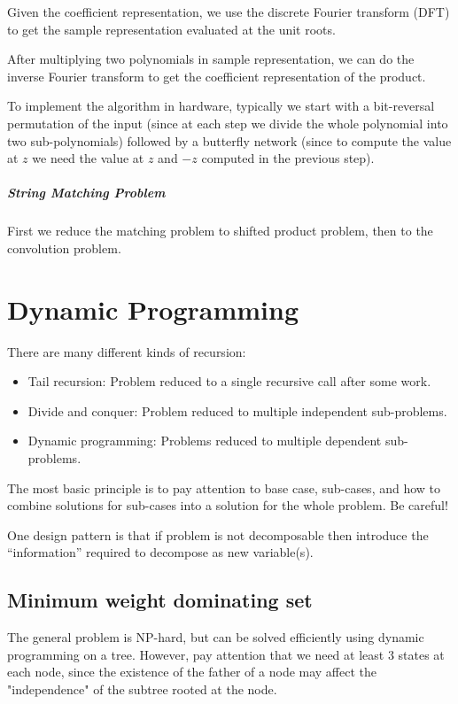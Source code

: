 \documentclass[openany]{book}
\begin{document}
Given the coefficient representation, we use the discrete Fourier transform (DFT) to get the sample representation evaluated at the unit roots.

After multiplying two polynomials in sample representation, we can do the inverse Fourier transform to get the coefficient representation of the product.

To implement the algorithm in hardware, typically we start with a bit-reversal permutation of the input (since at each step we divide the whole polynomial into two sub-polynomials) followed by a butterfly network (since to compute the value at $z$ we need the value at $z$ and $-z$ computed in the previous step).

\paragraph{String Matching Problem}
First we reduce the matching problem to shifted product problem, then to the convolution problem.

\chapter{Dynamic Programming}
There are many different kinds of recursion:
\begin{itemize}
\item Tail recursion: Problem reduced to a single recursive call after some work.
\item Divide and conquer: Problem reduced to multiple independent sub-problems.
\item Dynamic programming: Problems reduced to multiple dependent sub-problems.
\end{itemize}

The most basic principle is to pay attention to base case, sub-cases, and how to combine solutions for sub-cases into a solution for the whole problem. Be careful!

One design pattern is that if problem is not decomposable then introduce the “information” required to decompose as new variable(s).

\section{Minimum weight dominating set} The general problem is NP-hard, but can be solved efficiently using dynamic programming on a tree. However, pay attention that we need at least 3 states at each node, since the existence of the father of a node may affect the "independence" of the subtree rooted at the node.
\end{document}
